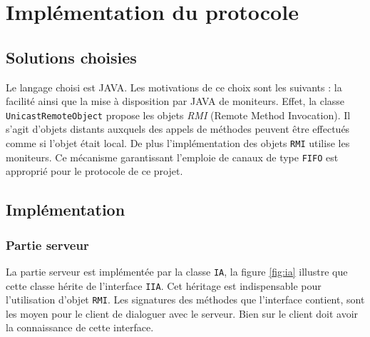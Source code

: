 \chapter{Implémentation du protocole}

\section{Solutions choisies}
Le langage choisi est \textsc{JAVA}. Les motivations de ce choix sont les suivants : la facilité  ainsi que la mise à disposition par \textsc{JAVA} de moniteurs. Effet, la classe \texttt{UnicastRemoteObject} propose les objets \textit{RMI} (Remote Method Invocation). Il s'agit d'objets \og distants \fg{} auxquels des appels de méthodes peuvent être effectués comme si l'objet était local. De plus  l'implémentation des objets \texttt{RMI}  utilise les moniteurs. Ce mécanisme garantissant l'emploie de canaux de type \texttt{FIFO} est approprié pour le protocole de ce projet.  

\section{Implémentation}

\subsection{Partie serveur}
La partie \og serveur \fg{} est implémentée par la classe \texttt{IA}, la figure \ref{fig:ia} illustre que cette classe hérite de l'interface \texttt{IIA}. Cet héritage est indispensable pour l'utilisation d'objet \texttt{RMI}. Les signatures des méthodes que l'interface contient, sont les moyen pour le client de dialoguer avec le serveur. Bien sur le client doit avoir la connaissance de cette interface.

